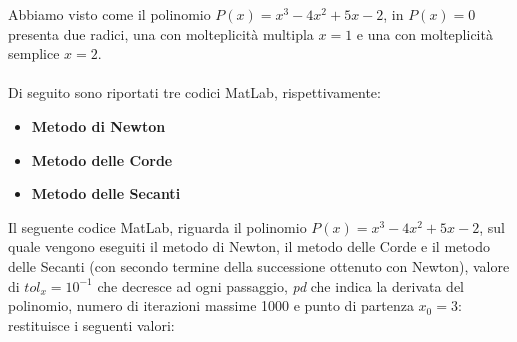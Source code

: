 Abbiamo visto come il polinomio $P(x) = x^3-4x^2+5x-2$, in $P(x)=0$ presenta due radici, una con molteplicità multipla $x=1$ e una con molteplicità semplice $x=2$.\\\\
Di seguito sono riportati tre codici MatLab, rispettivamente:
\begin{itemize}
	\item \textbf{Metodo di Newton}
		
	\item \textbf{Metodo delle Corde}
		
	\item \textbf{Metodo delle Secanti}
		
\end{itemize}
Il seguente codice MatLab, riguarda il polinomio $P(x) = x^3-4x^2+5x-2$, sul quale vengono eseguiti il metodo di Newton, il metodo delle Corde e il metodo delle Secanti (con secondo termine della successione ottenuto con Newton), valore di $tol_x=10^{-1}$ che decresce ad ogni passaggio, \textit{pd} che indica la derivata del polinomio, numero di iterazioni massime 1000 e punto di partenza $x_{0}=3$:\\
	
restituisce i seguenti valori:\\

